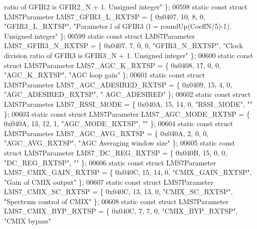 \begin{DoxyCode}
{       ratio of GFIR2 is GFIR2\_N + 1. Unsigned integer"} \};
00598 \textcolor{keyword}{static} \textcolor{keyword}{const} \textcolor{keyword}{struct }LMS7Parameter LMS7_GFIR3_L_RXTSP = \{ 0x0407, 10, 8, 0, \textcolor{stringliteral}{"GFIR3\_L\_RXTSP"}, \textcolor{stringliteral}{"Parameter l of
       GFIR3 (l = roundUp(CoeffN/5)-1). Unsigned integer"} \};
00599 \textcolor{keyword}{static} \textcolor{keyword}{const} \textcolor{keyword}{struct }LMS7Parameter LMS7_GFIR3_N_RXTSP = \{ 0x0407, 7, 0, 0, \textcolor{stringliteral}{"GFIR3\_N\_RXTSP"}, \textcolor{stringliteral}{"Clock division
       ratio of GFIR3 is GFIR3\_N + 1. Unsigned integer"} \};
00600 \textcolor{keyword}{static} \textcolor{keyword}{const} \textcolor{keyword}{struct }LMS7Parameter LMS7_AGC_K_RXTSP = \{ 0x0408, 17, 0, 0, \textcolor{stringliteral}{"AGC\_K\_RXTSP"}, \textcolor{stringliteral}{"AGC loop gain"} \};
00601 \textcolor{keyword}{static} \textcolor{keyword}{const} \textcolor{keyword}{struct }LMS7Parameter LMS7_AGC_ADESIRED_RXTSP = \{ 0x0409, 15, 4, 0, \textcolor{stringliteral}{"AGC\_ADESIRED\_RXTSP"}, \textcolor{stringliteral}{"
      AGC\_ADESIRED"} \};
00602 \textcolor{keyword}{static} \textcolor{keyword}{const} \textcolor{keyword}{struct }LMS7Parameter LMS7_RSSI_MODE = \{ 0x040A, 15, 14, 0, \textcolor{stringliteral}{"RSSI\_MODE"}, \textcolor{stringliteral}{""} \};
00603 \textcolor{keyword}{static} \textcolor{keyword}{const} \textcolor{keyword}{struct }LMS7Parameter LMS7_AGC_MODE_RXTSP = \{ 0x040A, 13, 12, 1, \textcolor{stringliteral}{"AGC\_MODE\_RXTSP"}, \textcolor{stringliteral}{""} \};
00604 \textcolor{keyword}{static} \textcolor{keyword}{const} \textcolor{keyword}{struct }LMS7Parameter LMS7_AGC_AVG_RXTSP = \{ 0x040A, 2, 0, 0, \textcolor{stringliteral}{"AGC\_AVG\_RXTSP"}, \textcolor{stringliteral}{"AGC Averaging
       window size"} \};
00605 \textcolor{keyword}{static} \textcolor{keyword}{const} \textcolor{keyword}{struct }LMS7Parameter LMS7_DC_REG_RXTSP = \{ 0x040B, 15, 0, 0, \textcolor{stringliteral}{"DC\_REG\_RXTSP"}, \textcolor{stringliteral}{""} \};
00606 \textcolor{keyword}{static} \textcolor{keyword}{const} \textcolor{keyword}{struct }LMS7Parameter LMS7_CMIX_GAIN_RXTSP = \{ 0x040C, 15, 14, 0, \textcolor{stringliteral}{"CMIX\_GAIN\_RXTSP"}, \textcolor{stringliteral}{"Gain of
       CMIX output"} \};
00607 \textcolor{keyword}{static} \textcolor{keyword}{const} \textcolor{keyword}{struct }LMS7Parameter LMS7_CMIX_SC_RXTSP = \{ 0x040C, 13, 13, 0, \textcolor{stringliteral}{"CMIX\_SC\_RXTSP"}, \textcolor{stringliteral}{"Spectrum
       control of CMIX"} \};
00608 \textcolor{keyword}{static} \textcolor{keyword}{const} \textcolor{keyword}{struct }LMS7Parameter LMS7_CMIX_BYP_RXTSP = \{ 0x040C, 7, 7, 0, \textcolor{stringliteral}{"CMIX\_BYP\_RXTSP"}, \textcolor{stringliteral}{"CMIX bypass"} 

\end{DoxyCode}
